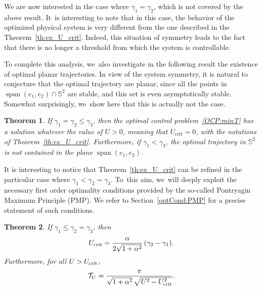 \documentclass[10pt]{amsart}
\newtheorem{theorem}{Theorem}
\theoremstyle{definition}
\begin{document}
We are now interested in the case where $\gamma_1=\gamma_2$, which is not covered by the above result. It~is interesting to note that in this case, the behavior of the optimized physical system is very different from the one described in the Theorem~\ref{th:ex_U_crit}. Indeed, this situation of symmetry leads to the fact that there is no longer a threshold from which the system is controllable.

To complete this analysis, we~also investigate in the following result the existence of optimal planar trajectories. In view of the system symmetry, it is natural to conjecture that the optimal trajectory are planar, since all the points in $\operatorname{span} (e_1, e_2) \cap \mathbb{S}^2$ are stable, and this set is even asymptotically stable. Somewhat surprisingly, we~show here that this is actually not the case.

\begin{theorem}\label{theo:gamma1=gamma2}
If $\gamma_1=\gamma_2\leq \gamma_3$, then the optimal control problem~\eqref{OCP:minT} has a solution whatever the value of $U >0$, meaning that $U_{\textrm{crit}}=0$, with the notations of Theorem~\ref{th:ex_U_crit}. Furthermore, if $\gamma_1<\gamma_3$, the optimal trajectory in $\mathbb{S}^2$ is not contained in the plane $\operatorname{span}(e_1,e_2)$.
\end{theorem}

It is interesting to notice that Theorem~\ref{th:ex_U_crit} can be refined in the particular case where $\gamma_1 < \gamma_2 = \gamma_3$. To~this aim, we~will deeply exploit the necessary first order optimality conditions provided by the so-called Pontryagin Maximum Principle (PMP). We refer to Section~\ref{optCond:PMP} for a precise statement of such conditions.


\begin{theorem}\label{theo:gamma2=gamma3}
If $\gamma_1\leq \gamma_2 = \gamma_3$, then
\[
U_\textnormal{crit} = \frac{\alpha}{2 \sqrt{1 + \alpha^2}}\, (\gamma_2 - \gamma_1).
\]
Furthermore, for all $U > U_\textnormal{crit}$,
\[
\mathcal{T}_U = \frac{\pi}{\sqrt{1 + \alpha^2}\, \sqrt{U^2 - U_\textnormal{crit}^2}}.
\]
\end{theorem}
\end{document}
